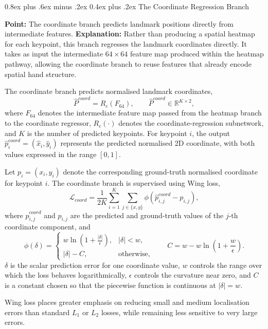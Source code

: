 \documentclass[10pt,letterpaper]{article}
\makeatletter
\renewcommand\subsubsection{\@startsection{subsubsection}{3}{\z@}%
  {0.8ex plus .6ex minus .2ex}%
  {0.4ex plus .2ex}%
  {\normalfont\small\itshape}}
\makeatother
\begin{document}
\subsubsection{The Coordinate Regression Branch}

\noindent\textbf{Point:} The coordinate branch predicts landmark positions directly from intermediate features.  
\textbf{Explanation:} Rather than producing a spatial heatmap for each keypoint, this branch regresses the landmark coordinates directly. It takes as input the intermediate \(64 \times 64\) feature map produced within the heatmap pathway, allowing the coordinate branch to reuse features that already encode spatial hand structure.

The coordinate branch predicts normalised landmark coordinates,
\[
\hat{P}^{coord} = R_c(F_{64}), \qquad \hat{P}^{coord} \in \mathbb{R}^{K \times 2},
\]
where \(F_{64}\) denotes the intermediate feature map passed from the heatmap branch to the coordinate regressor, \(R_c(\cdot)\) denotes the coordinate-regression subnetwork, and \(K\) is the number of predicted keypoints. For keypoint \(i\), the output \(\hat{p}^{coord}_i = (\hat{x}_i, \hat{y}_i)\) represents the predicted normalised 2D coordinate, with both values expressed in the range \([0,1]\).

Let \(p_i = (x_i, y_i)\) denote the corresponding ground-truth normalised coordinate for keypoint \(i\). The coordinate branch is supervised using Wing loss,
\[
\mathcal{L}_{coord}
=
\frac{1}{2K}
\sum_{i=1}^{K}
\sum_{j \in \{x,y\}}
\phi\!\left(\hat{p}^{coord}_{i,j} - p_{i,j}\right),
\]
where \(\hat{p}^{coord}_{i,j}\) and \(p_{i,j}\) are the predicted and ground-truth values of the \(j\)-th coordinate component, and
\[
\phi(\delta)=
\begin{cases}
w \ln\left(1 + \frac{|\delta|}{\epsilon}\right), & |\delta| < w, \\
|\delta| - C, & \text{otherwise,}
\end{cases}
\qquad
C = w - w \ln\left(1 + \frac{w}{\epsilon}\right).
\]
\(\delta\) is the scalar prediction error for one coordinate value, \(w\) controls the range over which the loss behaves logarithmically, \(\epsilon\) controls the curvature near zero, and \(C\) is a constant chosen so that the piecewise function is continuous at \(|\delta| = w\).

Wing loss places greater emphasis on reducing small and medium localisation errors than standard \(L_1\) or \(L_2\) losses, while remaining less sensitive to very large errors.
\end{document}
